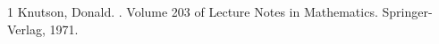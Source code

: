 \begin{thebibliography}{1}
Knutson, Donald.
.
\newblock Volume 203 of Lecture Notes in Mathematics. Springer-Verlag, 1971.
\end{thebibliography}
